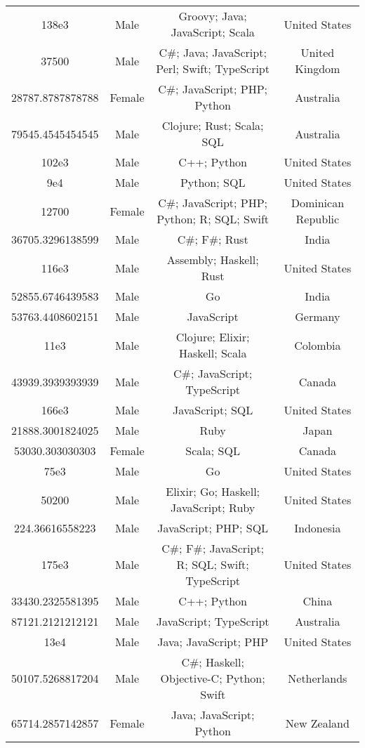 \begin{center}
\begin{tabular}{ |c|c|c|c| }
138e3  &  Male  &  Groovy; Java; JavaScript; Scala  &  United States  \\ 
37500  &  Male  &  C\#; Java; JavaScript; Perl; Swift; TypeScript  &  United Kingdom  \\ 
28787.8787878788  &  Female  &  C\#; JavaScript; PHP; Python  &  Australia  \\ 
79545.4545454545  &  Male  &  Clojure; Rust; Scala; SQL  &  Australia  \\ 
102e3  &  Male  &  C++; Python  &  United States  \\ 
9e4  &  Male  &  Python; SQL  &  United States  \\ 
12700  &  Female  &  C\#; JavaScript; PHP; Python; R; SQL; Swift  &  Dominican Republic  \\ 
36705.3296138599  &  Male  &  C\#; F\#; Rust  &  India  \\ 
116e3  &  Male  &  Assembly; Haskell; Rust  &  United States  \\ 
52855.6746439583  &  Male  &  Go  &  India  \\ 
53763.4408602151  &  Male  &  JavaScript  &  Germany  \\ 
11e3  &  Male  &  Clojure; Elixir; Haskell; Scala  &  Colombia  \\ 
43939.3939393939  &  Male  &  C\#; JavaScript; TypeScript  &  Canada  \\ 
166e3  &  Male  &  JavaScript; SQL  &  United States  \\ 
21888.3001824025  &  Male  &  Ruby  &  Japan  \\ 
53030.303030303  &  Female  &  Scala; SQL  &  Canada  \\ 
75e3  &  Male  &  Go  &  United States  \\ 
50200  &  Male  &  Elixir; Go; Haskell; JavaScript; Ruby  &  United States  \\ 
224.36616558223  &  Male  &  JavaScript; PHP; SQL  &  Indonesia  \\ 
175e3  &  Male  &  C\#; F\#; JavaScript; R; SQL; Swift; TypeScript  &  United States  \\ 
33430.2325581395  &  Male  &  C++; Python  &  China  \\ 
87121.2121212121  &  Male  &  JavaScript; TypeScript  &  Australia  \\ 
13e4  &  Male  &  Java; JavaScript; PHP  &  United States  \\ 
50107.5268817204  &  Male  &  C\#; Haskell; Objective-C; Python; Swift  &  Netherlands  \\ 
65714.2857142857  &  Female  &  Java; JavaScript; Python  &  New Zealand  \\ 

\end{tabular}
\end{center}
